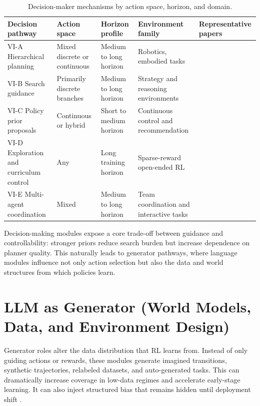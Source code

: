 ﻿\documentclass[conference]{IEEEtran}
\begin{document}
\begin{table}[t]
\centering
\small
\setlength{\tabcolsep}{4pt}
\begin{tabularx}{\textwidth}{P{2.2cm}P{1.9cm}P{2.3cm}P{2.4cm}Y}
\toprule
\textbf{Decision pathway} & \textbf{Action space} & \textbf{Horizon profile} & \textbf{Environment family} & \textbf{Representative papers}\\
\midrule
VI-A Hierarchical planning & Mixed discrete or continuous & Medium to long horizon & Robotics, embodied tasks & \cite{arxiv_p_2204_01691,arxiv_p_2305_16291,arxiv_p_2602_16165}\\
VI-B Search guidance & Primarily discrete branches & Medium to long horizon & Strategy and reasoning environments & \cite{arxiv_p_2602_07848,arxiv_p_2602_11551,doi_p_10_48448_q4pk_2g71}\\
VI-C Policy prior proposals & Continuous or hybrid & Short to medium horizon & Continuous control and recommendation & \cite{arxiv_p_2510_13229,arxiv_p_2602_06554,arxiv_p_2509_26093}\\
VI-D Exploration and curriculum control & Any & Long training horizon & Sparse-reward open-ended RL & \cite{arxiv_p_2512_16848,arxiv_p_2602_07906,arxiv_p_2601_16486}\\
VI-E Multi-agent coordination & Mixed & Medium to long horizon & Team coordination and interactive tasks & \cite{arxiv_p_2304_07297,arxiv_p_2602_08335,arxiv_p_2602_11583}\\
\bottomrule
\end{tabularx}
\caption{Decision-maker mechanisms by action space, horizon, and domain.}
\label{tab:t3_decision}
\end{table}

Decision-making modules expose a core trade-off between guidance and controllability: stronger priors reduce search burden but increase dependence on planner quality. This naturally leads to generator pathways, where language modules influence not only action selection but also the data and world structures from which policies learn.
\section{LLM as Generator (World Models, Data, and Environment Design)}
Generator roles alter the data distribution that RL learns from. Instead of only guiding actions or rewards, these modules generate imagined transitions, synthetic trajectories, relabeled datasets, and auto-generated tasks. This can dramatically increase coverage in low-data regimes and accelerate early-stage learning. It can also inject structured bias that remains hidden until deployment shift \cite{arxiv_p_2301_12050,arxiv_p_2602_02454,arxiv_p_2602_11075,arxiv_p_2310_20587,arxiv_p_2601_08107,arxiv_p_2512_24653,arxiv_p_2602_03305}.
\end{document}
